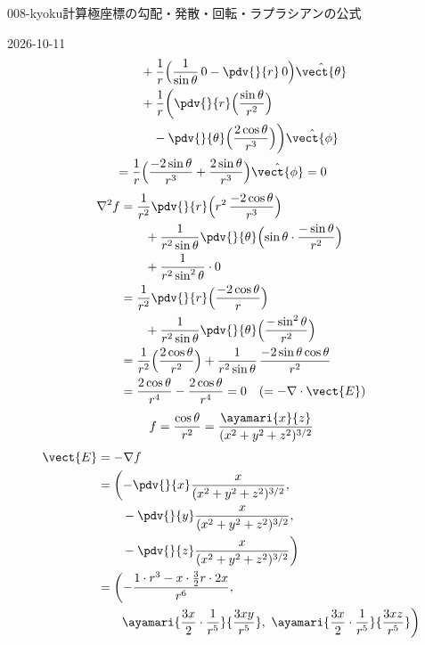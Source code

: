 \documentclass[uplatex,dvipdfmx,a4paper,11pt]{jsarticle}
\begin{document}
\begin{mondai}{008-kyoku}{計算}{極座標の勾配・発散・回転・ラプラシアンの公式}
\begin{kotaeutsushi}{2026-10-11}
\begin{align*}
&\qquad+\frac{1}{r}\Bigl(\frac{1}{\sin\theta}\,0-\pdv{}{r}\,0\Bigr)\hat{\vect{\theta}}\\
&\qquad+\frac{1}{r}\biggl(\pdv{}{r}\Bigl(\frac{\sin\theta}{r^{2}}\Bigr)\\
&\qquad\quad-\pdv{}{\theta}\Bigl(\frac{2\cos\theta}{r^{3}}\Bigr)\biggr)\hat{\vect{\phi}}\\
&=\frac{1}{r}\Bigl(\frac{-2\sin\theta}{r^{3}}+\frac{2\sin\theta}{r^{3}}\Bigr)\hat{\vect{\phi}}=0
\end{align*}
\begin{align*}
\nabla^{2}f&=\frac{1}{r^{2}}\pdv{}{r}\Bigl(r^{2}\,\frac{-2\cos\theta}{r^{3}}\Bigr)\\
&\qquad+\frac{1}{r^{2}\sin\theta}\pdv{}{\theta}\Bigl(\sin\theta\cdot\frac{-\sin\theta}{r^{2}}\Bigr)\\
&\qquad+\frac{1}{r^{2}\sin^{2}\theta}\cdot0\\
&=\frac{1}{r^{2}}\pdv{}{r}\Bigl(\frac{-2\cos\theta}{r}\Bigr)\\
&\qquad+\frac{1}{r^{2}\sin\theta}\pdv{}{\theta}\Bigl(\frac{-\sin^{2}\theta}{r^{2}}\Bigr)\\
&=\frac{1}{r^{2}}\Bigl(\frac{2\cos\theta}{r^{2}}\Bigr)+\frac{1}{r^{2}\sin\theta}\,\frac{-2\sin\theta\cos\theta}{r^{2}}\\
&=\frac{2\cos\theta}{r^{4}}-\frac{2\cos\theta}{r^{4}}=0\quad(=-\nabla\cdot\vect{E})
\end{align*}
\[ f=\frac{\cos\theta}{r^{2}}=\frac{\ayamari{x}{z}}{(x^{2}+y^{2}+z^{2})^{3/2}} \]
\begin{align*}
\vect{E}&=-\nabla f\\
&=\biggl(-\pdv{}{x}\frac{x}{(x^{2}+y^{2}+z^{2})^{3/2}},\\
&\qquad-\pdv{}{y}\frac{x}{(x^{2}+y^{2}+z^{2})^{3/2}},\\
&\qquad-\pdv{}{z}\frac{x}{(x^{2}+y^{2}+z^{2})^{3/2}}\biggr)\\
&=\biggl(-\frac{1\cdot r^{3}-x\cdot\frac{3}{2}r\cdot2x}{r^{6}},\\
&\qquad\ayamari{\frac{3x}{2}\cdot\frac{1}{r^{5}}}{\frac{3xy}{r^{5}}},\ \ayamari{\frac{3x}{2}\cdot\frac{1}{r^{5}}}{\frac{3xz}{r^{5}}}\biggr)
\end{align*}

\end{kotaeutsushi}
\end{mondai}
\end{document}

